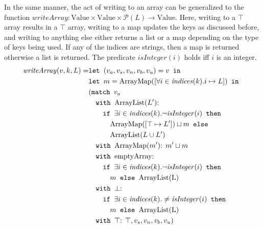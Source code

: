 In the same manner, the act of writing to an array can be generalized to the function $\mathit{writeArray}: \text{Value} \times \text{Value} \times \mathcal{P}(L) \rightarrow \text{Value}$. Here, writing to a $\top$ array results in a $\top$ array, writing to a map updates the keys as discussed before, and writing to anything else either returns a list or a map depending on the type of keys being used. If any of the indices are strings, then a map is returned otherwise a list is returned. The predicate $\mathit{isInteger}(i)$ holds iff $i$ is an integer.
\begin{align}
\mathit{writeArray}(v, k, L) =       & \texttt{let } (v_a,v_s,v_n,v_b,v_u) = v \texttt{ in }\notag\\
                            &\texttt{let } m = \text{ArrayMap}([\forall i \in \mathit{indices}(k). i \mapsto L]) \texttt{ in }\notag\\
                            &(\texttt{match }v_a \notag\\
                            & \quad \texttt{with }\text{ArrayList}(L')\text{: } \notag\\
                            &\quad\quad \texttt{if }\exists i \in \mathit{indices}(k).\neg\mathit{isInteger}(i)\texttt{ then } \notag\\
                            &\quad\quad\quad \text{ArrayMap}([\top \mapsto L'])\sqcup m \texttt{ else } \notag\\
                            &\quad\quad\quad \text{ArrayList}(L\cup L')\notag\\
                            & \quad \texttt{with }\text{ArrayMap}(m')\text{: } m'\sqcup m\notag\\
                            & \quad \texttt{with }\text{emptyArray}\text{: } \notag\\
                            & \quad\quad\texttt{if }\exists i \in \mathit{indices}(k).\neg\mathit{isInteger}(i)\texttt{ then } \notag\\
                            &\quad\quad\quad m \texttt{ else } \text{ArrayList(L)}\notag\\
                            & \quad \texttt{with }\bot\text{: }  \notag\\
                            & \quad\quad\texttt{if }\exists i \in \mathit{indices}(k).\neq\mathit{isInteger}(i)\texttt{ then } \notag\\
                            &\quad\quad\quad m \texttt{ else } \text{ArrayList(L)}\notag\\
                            & \quad \texttt{with }\top\text{: } \top, v_s, v_n, v_b, v_u)
\end{align}

